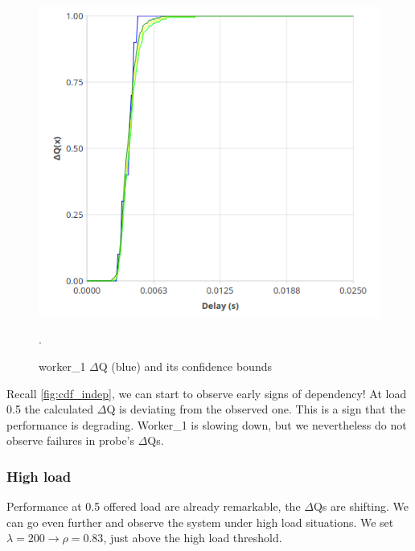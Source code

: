     \begin{figure}[H]
        \begin{center}
                \includegraphics[scale=0.6]{img/overload_2/150_worker.png}
        \end{center}
            \caption{worker\_1 $\Delta$Q (blue) and its confidence bounds}.
        \label{fig:op}
    \end{figure}
    

    Recall \ref{fig:cdf_indep}, we can start to observe early signs of dependency! At load 0.5 the calculated $\Delta$Q is deviating from the observed one. This is a sign that the performance is degrading. Worker\_1 is slowing down, but we nevertheless do not observe failures in probe's $\Delta$Qs.

\subsubsection{High load}
    Performance at 0.5 offered load are already remarkable, the $\Delta$Qs are shifting.    We can go even further and observe the system under high load situations. We set $\lambda = 200 \rightarrow \rho = 0.83$, just above the high load threshold.
    
